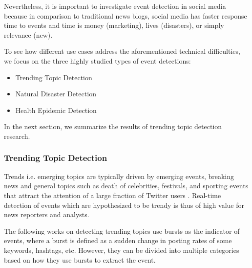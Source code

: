 \documentclass[11pt,a4paper]{article}
\begin{document}
Nevertheless, it is important to investigate event detection in social media because in comparison to traditional news blogs, social media has faster response time to events and time is money (marketing), lives (disasters), or simply relevance (new).

To see how different use cases address the aforementioned technical difficulties, we focus on the three highly studied types of event detections:
\begin{itemize}
\item Trending Topic Detection
\item Natural Disaster Detection
\item Health Epidemic Detection
\end{itemize}

In the next section, we summarize the results of trending topic detection research.

\subsubsection{Trending Topic Detection}

Trends i.e. emerging topics are typically driven by emerging events, breaking news and general topics such as death of celebrities, festivals, and sporting events that attract the attention of a large fraction of Twitter users \cite{mathioudakis}. Real-time detection of events which are hypothesized to be trendy is thus of high value for  news reporters and analysts. 

The following works on detecting trending topics use bursts as the indicator of events, where a burst is defined as a sudden change in posting rates of some keywords, hashtags, etc. However, they can be divided into multiple categories based on how they use bursts to extract the event. 
\end{document}
